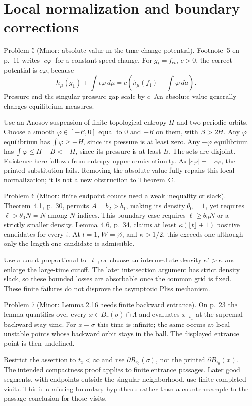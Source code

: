 \documentclass[10pt]{article}
\begin{document}
\section*{Local normalization and boundary corrections}
Problem 5 (Minor: absolute value in the time-change potential).  Footnote 5 on p. 11 writes \(|c\varphi|\) for a constant speed change. For \(g_t=f_{ct}\), \(c>0\), the correct potential is \(c\varphi\), because \[h_\mu(g_1)+\int c\varphi\,d\mu
 =c\left(h_\mu(f_1)+\int\varphi\,d\mu\right).\] Pressure and the singular pressure gap scale by \(c\). An absolute value generally changes equilibrium measures.\par
Use an Anosov suspension of finite topological entropy \(H\) and two periodic orbits. Choose a smooth \(\varphi\in[-B,0]\) equal to \(0\) and \(-B\) on them, with \(B>2H\). Any \(\varphi\) equilibrium has \(\int\varphi\ge-H\), since its pressure is at least zero. Any \(-\varphi\) equilibrium has \(\int\varphi\le H-B<-H\), since its pressure is at least \(B\). The sets are disjoint. Existence here follows from entropy upper semicontinuity. As \(|c\varphi|=-c\varphi\), the printed substitution fails. Removing the absolute value fully repairs this local normalization; it is not a new obstruction to Theorem C.\par
Problem 6 (Minor: finite endpoint counts need a weak inequality or slack).  Theorem 4.1, p. 30, permits \(A=b_2>b_1\), making its density \(\theta_0=1\), yet requires \(\ell>\theta_0N=N\) among \(N\) indices. This boundary case requires \(\ell\ge\theta_0N\) or a strictly smaller density. Lemma 4.6, p. 34, claims at least \(\kappa(\lfloor t\rfloor+1)\) positive candidates for every \(t\). At \(t=1\), \(W=\varnothing\), and \(\kappa>1/2\), this exceeds one although only the length-one candidate is admissible.\par
Use a count proportional to \(\lfloor t\rfloor\), or choose an intermediate density \(\kappa'>\kappa\) and enlarge the large-time cutoff. The later intersection argument has strict density slack, so these bounded losses are absorbable once the common grid is fixed. These finite failures do not disprove the asymptotic Pliss mechanism.\par
Problem 7 (Minor: Lemma 2.16 needs finite backward entrance).  On p. 23 the lemma quantifies over every \(x\in B_r(\sigma)\cap\Lambda\) and evaluates \(x_{-t_x}\) at the supremal backward stay time. For \(x=\sigma\) this time is infinite; the same occurs at local unstable points whose backward orbit stays in the ball. The displayed entrance point is then undefined.\par
Restrict the assertion to \(t_x<\infty\) and use \(\partial B_{r_0}(\sigma)\), not the printed \(\partial B_{r_0}(x)\). The intended compactness proof applies to finite entrance passages. Later good segments, with endpoints outside the singular neighborhood, use finite completed visits. This is a missing boundary hypothesis rather than a counterexample to the passage conclusion for those visits.\par
\end{document}
